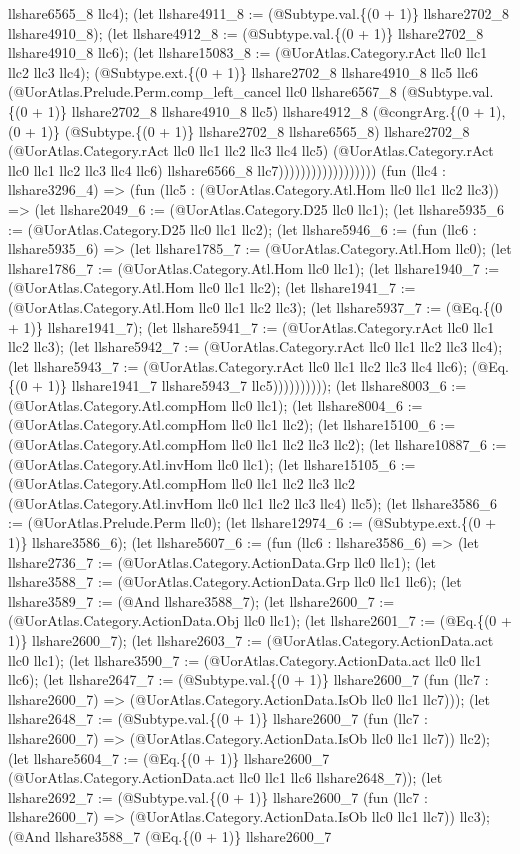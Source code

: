 \documentclass[11pt]{article}
\begin{document}
llshare6565\_8 llc4); (let llshare4911\_8 := (@Subtype.val.\{(0 + 1)\} llshare2702\_8 llshare4910\_8); (let llshare4912\_8 := (@Subtype.val.\{(0 + 1)\} llshare2702\_8 llshare4910\_8 llc6); (let llshare15083\_8 := (@UorAtlas.Category.rAct llc0 llc1 llc2 llc3 llc4); (@Subtype.ext.\{(0 + 1)\} llshare2702\_8 llshare4910\_8 llc5 llc6 (@UorAtlas.Prelude.Perm.comp\_left\_cancel llc0 llshare6567\_8 (@Subtype.val.\{(0 + 1)\} llshare2702\_8 llshare4910\_8 llc5) llshare4912\_8 (@congrArg.\{(0 + 1), (0 + 1)\} (@Subtype.\{(0 + 1)\} llshare2702\_8 llshare6565\_8) llshare2702\_8 (@UorAtlas.Category.rAct llc0 llc1 llc2 llc3 llc4 llc5) (@UorAtlas.Category.rAct llc0 llc1 llc2 llc3 llc4 llc6) llshare6566\_8 llc7)))))))))))))))))) (fun (llc4 : llshare3296\_4) => (fun (llc5 : (@UorAtlas.Category.Atl.Hom llc0 llc1 llc2 llc3)) => (let llshare2049\_6 := (@UorAtlas.Category.D25 llc0 llc1); (let llshare5935\_6 := (@UorAtlas.Category.D25 llc0 llc1 llc2); (let llshare5946\_6 := (fun (llc6 : llshare5935\_6) => (let llshare1785\_7 := (@UorAtlas.Category.Atl.Hom llc0); (let llshare1786\_7 := (@UorAtlas.Category.Atl.Hom llc0 llc1); (let llshare1940\_7 := (@UorAtlas.Category.Atl.Hom llc0 llc1 llc2); (let llshare1941\_7 := (@UorAtlas.Category.Atl.Hom llc0 llc1 llc2 llc3); (let llshare5937\_7 := (@Eq.\{(0 + 1)\} llshare1941\_7); (let llshare5941\_7 := (@UorAtlas.Category.rAct llc0 llc1 llc2 llc3); (let llshare5942\_7 := (@UorAtlas.Category.rAct llc0 llc1 llc2 llc3 llc4); (let llshare5943\_7 := (@UorAtlas.Category.rAct llc0 llc1 llc2 llc3 llc4 llc6); (@Eq.\{(0 + 1)\} llshare1941\_7 llshare5943\_7 llc5)))))))))); (let llshare8003\_6 := (@UorAtlas.Category.Atl.compHom llc0 llc1); (let llshare8004\_6 := (@UorAtlas.Category.Atl.compHom llc0 llc1 llc2); (let llshare15100\_6 := (@UorAtlas.Category.Atl.compHom llc0 llc1 llc2 llc3 llc2); (let llshare10887\_6 := (@UorAtlas.Category.Atl.invHom llc0 llc1); (let llshare15105\_6 := (@UorAtlas.Category.Atl.compHom llc0 llc1 llc2 llc3 llc2 (@UorAtlas.Category.Atl.invHom llc0 llc1 llc2 llc3 llc4) llc5); (let llshare3586\_6 := (@UorAtlas.Prelude.Perm llc0); (let llshare12974\_6 := (@Subtype.ext.\{(0 + 1)\} llshare3586\_6); (let llshare5607\_6 := (fun (llc6 : llshare3586\_6) => (let llshare2736\_7 := (@UorAtlas.Category.ActionData.Grp llc0 llc1); (let llshare3588\_7 := (@UorAtlas.Category.ActionData.Grp llc0 llc1 llc6); (let llshare3589\_7 := (@And llshare3588\_7); (let llshare2600\_7 := (@UorAtlas.Category.ActionData.Obj llc0 llc1); (let llshare2601\_7 := (@Eq.\{(0 + 1)\} llshare2600\_7); (let llshare2603\_7 := (@UorAtlas.Category.ActionData.act llc0 llc1); (let llshare3590\_7 := (@UorAtlas.Category.ActionData.act llc0 llc1 llc6); (let llshare2647\_7 := (@Subtype.val.\{(0 + 1)\} llshare2600\_7 (fun (llc7 : llshare2600\_7) => (@UorAtlas.Category.ActionData.IsOb llc0 llc1 llc7))); (let llshare2648\_7 := (@Subtype.val.\{(0 + 1)\} llshare2600\_7 (fun (llc7 : llshare2600\_7) => (@UorAtlas.Category.ActionData.IsOb llc0 llc1 llc7)) llc2); (let llshare5604\_7 := (@Eq.\{(0 + 1)\} llshare2600\_7 (@UorAtlas.Category.ActionData.act llc0 llc1 llc6 llshare2648\_7)); (let llshare2692\_7 := (@Subtype.val.\{(0 + 1)\} llshare2600\_7 (fun (llc7 : llshare2600\_7) => (@UorAtlas.Category.ActionData.IsOb llc0 llc1 llc7)) llc3); (@And llshare3588\_7 (@Eq.\{(0 + 1)\} llshare2600\_7 
\end{document}
